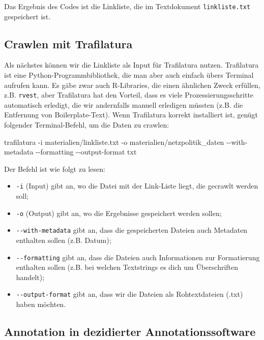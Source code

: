 \documentclass[
  letterpaper,
  DIV=11,
  numbers=noendperiod]{scrreprt}
\newenvironment{Shaded}{\begin{snugshade}}{\end{snugshade}}
\newcommand{\NormalTok}[1]{\textcolor[rgb]{0.00,0.23,0.31}{#1}}
\begin{document}
Das Ergebnis des Codes ist die Linkliste, die im Textdokument
\texttt{linkliste.txt} gespeichert ist.

\subsection{Crawlen mit Trafilatura}\label{crawlen-mit-trafilatura}

Als nächstes können wir die Linkliste als Input für Trafilatura nutzen.
Trafilatura ist eine Python-Programmbibliothek, die man aber auch
einfach übers Terminal aufrufen kann. Es gäbe zwar auch R-Libraries, die
einen ähnlichen Zweck erfüllen, z.B. \texttt{rvest}, aber Trafilatura
hat den Vorteil, dass es viele Prozessierungsschritte automatisch
erledigt, die wir andernfalls manuell erledigen müssten (z.B. die
Entfernung von Boilerplate-Text). Wenn Trafilatura korrekt installiert
ist, genügt folgender Terminal-Befehl, um die Daten zu crawlen:

\begin{Shaded}
\begin{Highlighting}[]
\NormalTok{trafilatura {-}i materialien/linkliste.txt {-}o materialien/netzpolitik\_daten {-}{-}with{-}metadata {-}{-}formatting {-}{-}output{-}format txt}
\end{Highlighting}
\end{Shaded}

Der Befehl ist wie folgt zu lesen:

\begin{itemize}
\item
  \texttt{-i} (Input) gibt an, wo die Datei mit der Link-Liste liegt,
  die gecrawlt werden soll;
\item
  \texttt{-o} (Output) gibt an, wo die Ergebnisse gespeichert werden
  sollen;
\item
  \texttt{-\/-with-metadata} gibt an, dass die gespeicherten Dateien
  auch Metadaten enthalten sollen (z.B. Datum);
\item
  \texttt{-\/-formatting} gibt an, dass die Dateien auch Informationen
  zur Formatierung enthalten sollen (z.B. bei welchen Textstrings es
  dich um Überschriften handelt);
\item
  \texttt{-\/-output-format} gibt an, dass wir die Dateien als
  Rohtextdateien (.txt) haben möchten.
\end{itemize}

\subsection{Annotation in dezidierter
Annotationssoftware}\label{annotation-in-dezidierter-annotationssoftware}
\end{document}
